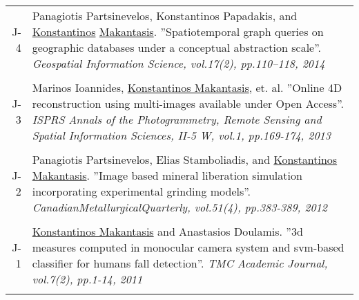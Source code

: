 \documentclass[a4paper,10pt]{article}
\begin{document}
\begin{longtable}{r p{11cm}}
J-4 &\small{Panagiotis Partsinevelos, Konstantinos Papadakis, and \underline{Konstantinos} \underline{Makantasis}. ''Spatiotemporal graph queries on geographic databases under a conceptual abstraction scale''. \textit{Geospatial Information Science, vol.17(2), pp.110–118, 2014}}\\
 \multicolumn{2}{c}{} \\
J-3 &\small{Marinos Ioannides, \underline{Konstantinos Makantasis}, et. al. ''Online 4D reconstruction using multi-images available under Open Access''. \textit{ISPRS Annals of the Photogrammetry, Remote Sensing and Spatial Information Sciences, II-5 W, vol.1, pp.169-174, 2013}}\\
 \multicolumn{2}{c}{} \\  
J-2 &\small{Panagiotis Partsinevelos, Elias Stamboliadis, and \underline{Konstantinos Makantasis}. ''Image based mineral liberation simulation incorporating experimental grinding models''. \textit{CanadianMetallurgicalQuarterly, vol.51(4), pp.383-389, 2012}}\\
 \multicolumn{2}{c}{} \\ 
J-1 &\small{\underline{Konstantinos Makantasis} and Anastasios Doulamis. ''3d measures computed in monocular camera system and svm-based classifier for humans fall detection''. \textit{TMC Academic Journal, vol.7(2), pp.1-14, 2011}}\\
 \multicolumn{2}{c}{} \\ 
 

\end{longtable}
\end{document}
